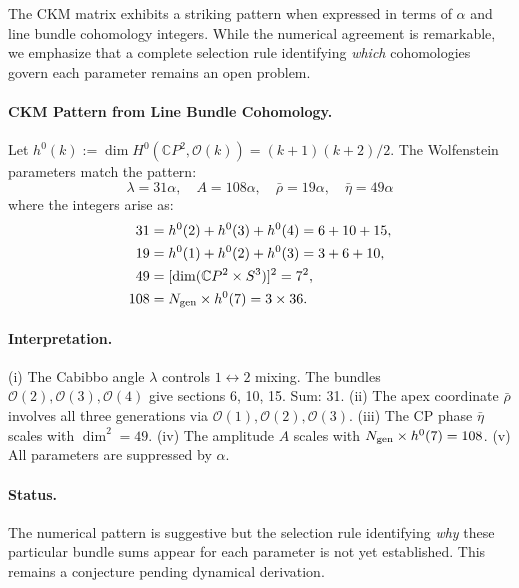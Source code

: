 The CKM matrix exhibits a striking pattern when expressed in terms of $\alpha$ and 
line bundle cohomology integers. While the numerical agreement is remarkable, we 
emphasize that a complete selection rule identifying \emph{which} cohomologies 
govern each parameter remains an open problem.

\paragraph{CKM Pattern from Line Bundle Cohomology.}
Let $h^0(k) := \dim H^0(\mathbb{C}P^2, \mathcal{O}(k)) = (k+1)(k+2)/2$.
The Wolfenstein parameters match the pattern:
\begin{equation}\label{eq:ckm-integers}
\boxed{\lambda = 31\alpha, \quad A = 108\alpha, \quad 
\bar{\rho} = 19\alpha, \quad \bar{\eta} = 49\alpha}
\end{equation}
where the integers arise as:
\begin{align}
31 &= h^0(2) + h^0(3) + h^0(4) = 6 + 10 + 15, \\
19 &= h^0(1) + h^0(2) + h^0(3) = 3 + 6 + 10, \\
49 &= [\dim(\mathbb{C}P^2 \times S^3)]^2 = 7^2, \\
108 &= N_{\rm gen} \times h^0(7) = 3 \times 36.
\end{align}

\paragraph{Interpretation.}
(i) The Cabibbo angle $\lambda$ controls $1\leftrightarrow 2$ mixing.
The bundles $\mathcal{O}(2), \mathcal{O}(3), \mathcal{O}(4)$ give sections 6, 10, 15. Sum: 31.
(ii) The apex coordinate $\bar{\rho}$ involves all three generations via $\mathcal{O}(1), \mathcal{O}(2), \mathcal{O}(3)$.
(iii) The CP phase $\bar{\eta}$ scales with $\dim^2 = 49$.
(iv) The amplitude $A$ scales with $N_{\rm gen} \times h^0(7) = 108$.
(v) All parameters are suppressed by $\alpha$.

\paragraph{Status.}
The numerical pattern is suggestive but the selection rule identifying \emph{why} 
these particular bundle sums appear for each parameter is not yet established. 
This remains a conjecture pending dynamical derivation.

